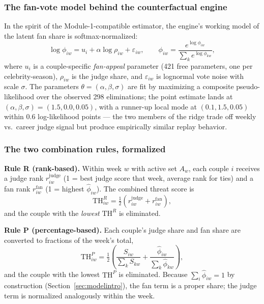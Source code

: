 \documentclass[10pt]{article}
\begin{document}
\subsubsection{The fan-vote model behind the counterfactual engine}

In the spirit of the Module-1-compatible estimator, the engine's working model of the
latent fan share is softmax-normalized:
\begin{equation}
\log \phi_{iw} = u_i + \alpha \log \rho_{iw} + \varepsilon_{iw}, \qquad
\phi_{iw} = \frac{e^{\log \phi_{iw}}}{\sum_k e^{\log \phi_{kw}}},
\end{equation}
where $u_i$ is a couple-specific \emph{fan-appeal} parameter (421 free parameters, one
per celebrity-season), $\rho_{iw}$ is the judge share, and $\varepsilon_{iw}$ is lognormal
vote noise with scale $\sigma$. The parameters $\theta = (\alpha, \beta, \sigma)$ are fit
by maximizing a composite pseudo-likelihood over the observed 298 eliminations; the
point estimate lands at $(\alpha, \beta, \sigma) = (1.5, 0.0, 0.05)$, with a runner-up
local mode at $(0.1, 1.5, 0.05)$ within 0.6 log-likelihood points --- the two members of
the ridge trade off weekly vs.\ career judge signal but produce empirically similar
replay behavior.

\subsubsection{The two combination rules, formalized}

\textbf{Rule R (rank-based).} Within week $w$ with active set $A_w$, each couple $i$
receives a judge rank $r^{\text{judge}}_{iw}$ (1 = best judge score that week, average
rank for ties) and a fan rank $r^{\text{fan}}_{iw}$ (1 = highest $\hat\phi_{iw}$). The
combined threat score is
\begin{equation}
\mathrm{TH}^{R}_{iw} = \tfrac12 \left( r^{\text{judge}}_{iw} + r^{\text{fan}}_{iw} \right),
\end{equation}
and the couple with the \emph{lowest} $\mathrm{TH}^R$ is eliminated.

\textbf{Rule P (percentage-based).} Each couple's judge share and fan share are
converted to fractions of the week's total,
\begin{equation}
\mathrm{TH}^{P}_{iw} = \tfrac12 \left( \frac{S_{iw}}{\sum_k S_{kw}} + \frac{\hat\phi_{iw}}{\sum_k \hat\phi_{kw}} \right),
\end{equation}
and the couple with the lowest $\mathrm{TH}^P$ is eliminated. Because $\sum_i \hat\phi_{iw} = 1$ by construction (Section~\ref{sec:modelintro}), the fan term is a proper share; the judge term is normalized analogously within the week.
\end{document}
